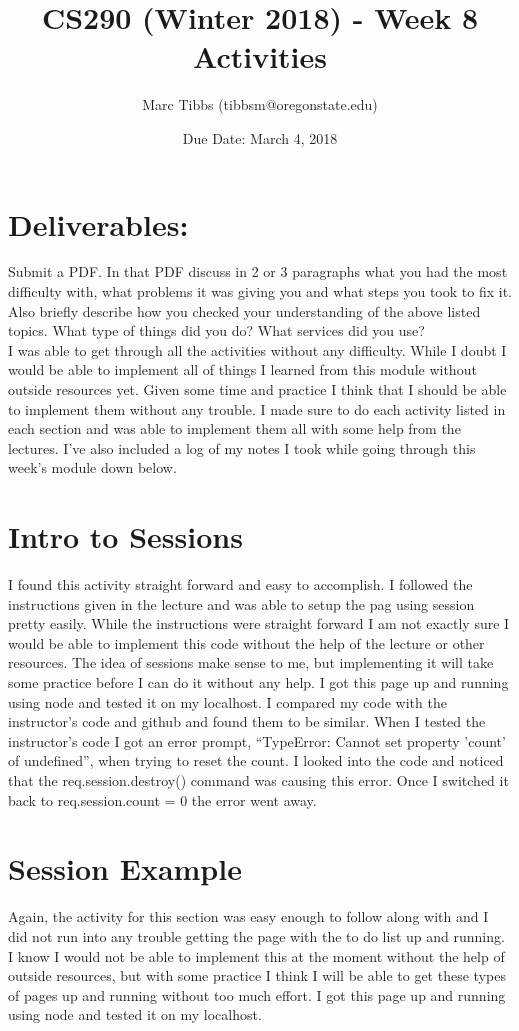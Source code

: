 \documentclass{article}
\title{CS290 (Winter 2018) - Week 8 Activities}
\author{Marc Tibbs (tibbsm@oregonstate.edu)}
\date{Due Date: March 4, 2018}
\begin{document}
\maketitle

\section*{Deliverables:}

Submit a PDF. In that PDF discuss in 2 or 3 paragraphs what you had the most difficulty with, what problems it was giving you and what steps you took to fix it. Also briefly describe how you checked your understanding of the above listed topics. What type of things did you do? What services did you use?\\[.15cm]

I was able to get through all the activities without any difficulty. While I doubt I would be able to implement all of things I learned from this module without outside resources yet. Given some time and practice I think that I should be able to implement them without any trouble. I made sure to do each activity listed in each section and was able to implement them all with some help from the lectures. I've also included a log of my notes I took while going through this week's module down below. 

\section*{Intro to Sessions}
I found this activity straight forward and easy to accomplish. I followed the instructions given in the lecture and was able to setup the pag using session pretty easily. While the instructions were straight forward I am not exactly sure I would be able to implement this code without the help of the lecture or other resources. The idea of sessions make sense to me, but implementing it will take some practice before I can do it without any help. I got this page up and running using node and tested it on my localhost. I compared my code with the instructor's code and github and found them to be similar. When I tested the instructor's code I got an error prompt, ``TypeError: Cannot set property 'count' of undefined'', when trying to reset the count. I looked into the code and noticed that the req.session.destroy() command was causing this error. Once I switched it back to req.session.count = 0 the error went away. 

\section*{Session Example}
Again, the activity for this section was easy enough to follow along with and I did not run into any trouble getting the page with the to do list up and running. I know I would not be able to implement this at the moment without the help of outside resources, but with some practice I think I will be able to get these types of pages up and running without too much effort. I got this page up and running using node and tested it on my localhost. 
\end{document}
